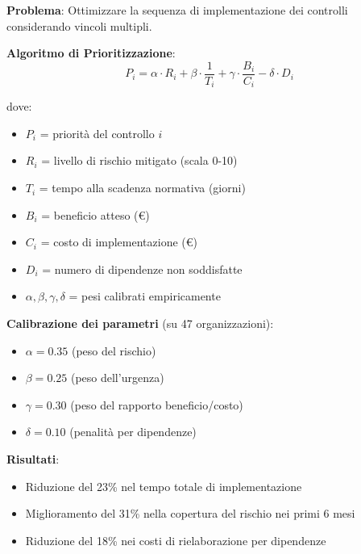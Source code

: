 \begin{tcolorbox}[
    colback=blue!5!white,
    colframe=blue!75!black,
    title={\textbf{Innovation Box 4.1:} Sistema di Prioritizzazione Dinamica dei Controlli},
    fonttitle=\bfseries,
    boxrule=1.5pt,
    arc=2mm,
    breakable
]
\textbf{Problema}: Ottimizzare la sequenza di implementazione dei controlli considerando vincoli multipli.

\vspace{0.3cm}
\textbf{Algoritmo di Prioritizzazione}:
\begin{equation*}
P_i = \alpha \cdot R_i + \beta \cdot \frac{1}{T_i} + \gamma \cdot \frac{B_i}{C_i} - \delta \cdot D_i
\end{equation*}

dove:
\begin{itemize}
\item $P_i$ = priorità del controllo $i$
\item $R_i$ = livello di rischio mitigato (scala 0-10)
\item $T_i$ = tempo alla scadenza normativa (giorni)
\item $B_i$ = beneficio atteso (€)
\item $C_i$ = costo di implementazione (€)
\item $D_i$ = numero di dipendenze non soddisfatte
\item $\alpha, \beta, \gamma, \delta$ = pesi calibrati empiricamente
\end{itemize}

\vspace{0.3cm}
\textbf{Calibrazione dei parametri} (su 47 organizzazioni):
\begin{itemize}
\item $\alpha = 0.35$ (peso del rischio)
\item $\beta = 0.25$ (peso dell'urgenza)
\item $\gamma = 0.30$ (peso del rapporto beneficio/costo)
\item $\delta = 0.10$ (penalità per dipendenze)
\end{itemize}

\textbf{Risultati}:
\begin{itemize}
\item Riduzione del 23\% nel tempo totale di implementazione
\item Miglioramento del 31\% nella copertura del rischio nei primi 6 mesi
\item Riduzione del 18\% nei costi di rielaborazione per dipendenze
\end{itemize}
\end{tcolorbox}

